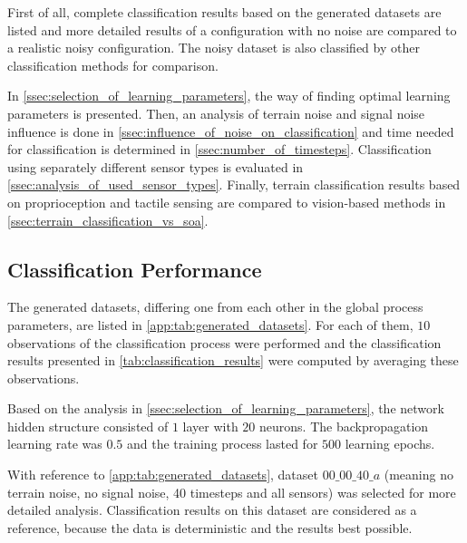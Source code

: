 First of all, complete classification results based on the generated datasets are listed and more detailed results of a configuration with no noise are  compared to a realistic noisy configuration. The noisy dataset is also classified by other classification methods for comparison.

In \cref{ssec:selection_of_learning_parameters}, the way of finding optimal learning parameters is presented. Then, an analysis of terrain noise and signal noise influence is done in \cref{ssec:influence_of_noise_on_classification} and time needed for classification is determined in \cref{ssec:number_of_timesteps}. Classification using separately different sensor types is evaluated in \cref{ssec:analysis_of_used_sensor_types}. Finally, terrain classification results based on proprioception and tactile sensing are compared to vision-based methods in \cref{ssec:terrain_classification_vs_soa}.

\subsection{Classification Performance} \label{ssec:classification_performance}
The generated datasets, differing one from each other in the global process parameters, are listed in \cref{app:tab:generated_datasets}. For each of them, $ 10 $ observations of the classification process were performed and the classification results presented in \cref{tab:classification_results} were computed by averaging these observations.

Based on the analysis in \cref{ssec:selection_of_learning_parameters}, the network hidden structure consisted of $ 1 $ layer with $ 20 $ neurons. The backpropagation learning rate was $ 0.5 $ and the training process lasted for $ 500 $ learning epochs.

With reference to \cref{app:tab:generated_datasets}, dataset $ 00\_00\_40\_a $ (meaning no terrain noise, no signal noise, 40 timesteps and all sensors) was selected for more detailed analysis. Classification results on this dataset are considered as a reference, because the data is deterministic and the results best possible.

